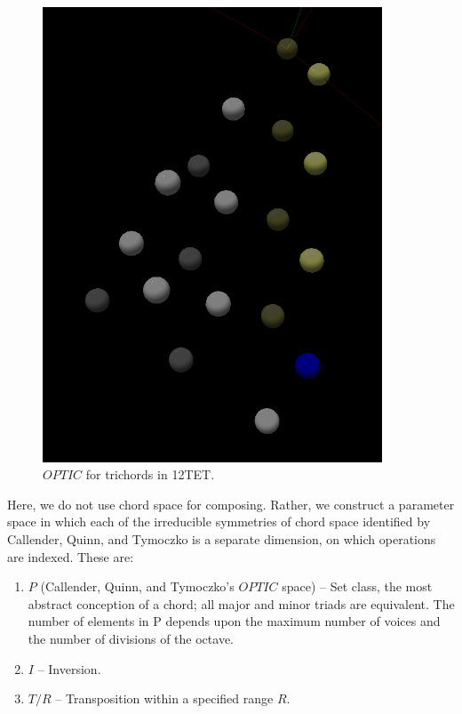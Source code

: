 \documentclass[english,11pt,letterpaper,onecolumn]{scrartcl}
\numberwithin{equation}{section}
\begin{document}
    \begin{figure}
        \centerline{\includegraphics[width = 0.9\textwidth]{opttic}}
        \caption{\label{fig:optic} 
            $OPTIC$ for trichords in 12TET.}
    \end{figure}
    
    Here, we do not use chord space for composing. Rather, we construct a parameter 
    space in which each of the irreducible symmetries of chord space identified by 
    Callender, Quinn, and Tymoczko is a separate dimension, on which operations are 
    indexed. These are:
    
    \begin{enumerate}
        \item $P$ (Callender, Quinn, and Tymoczko's $OPTIC$ space) -- Set class, the 
        most abstract conception of a chord; all major and minor triads are equivalent. 
        The number of elements in P depends upon the maximum number of voices and the 
        number of divisions of the octave.
        \item $I$ -- Inversion.
        \item $T/R$ -- Transposition within a specified range $R$.
    \end{enumerate}
    
\end{document}
